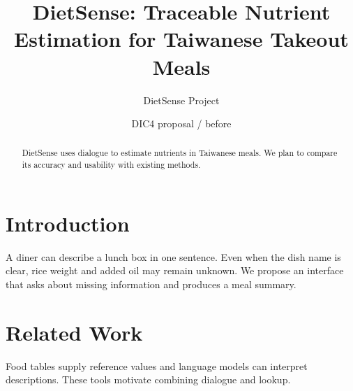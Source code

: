 \documentclass[11pt]{article}
\title{DietSense: Traceable Nutrient Estimation for Taiwanese Takeout Meals}
\author{DietSense Project}
\date{DIC4 proposal / before}
\begin{document}
\maketitle
\begin{abstract}
DietSense uses dialogue to estimate nutrients in Taiwanese meals. We plan to compare its accuracy and usability with existing methods.\end{abstract}
\section{Introduction}
A diner can describe a lunch box in one sentence. Even when the dish name is clear, rice weight and added oil may remain unknown. We propose an interface that asks about missing information and produces a meal summary.
\section{Related Work}
Food tables supply reference values and language models can interpret descriptions. These tools motivate combining dialogue and lookup.
\end{document}
